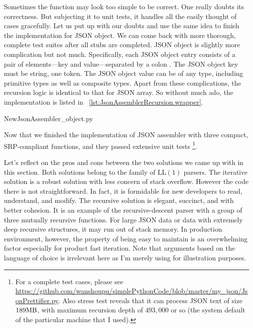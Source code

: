 Sometimes the function may look too simple to be correct.
One really doubts its correctness.
But subjecting it to unit tests, it handles all the easily thought of cases gracefully.
Let us put up with our doubts and use the same idea
to finish the implementation for JSON object.
We can come back with more thorough, complete test suites after all stubs are completed.
JSON object is slightly more complication but not much.
Specifically, each JSON object entry consists of a pair of elements---key and value---separated
by a colon .
The JSON object key must be string, one token.
The JSON object value can be of any type, including primitive types as well as composite types.
Apart from these complications, the recursion logic is identical to that for JSON array.
So without much ado, the implementation is listed in ~\autoref{lst:JsonAssemblerRecursion.wrapper}.

\begin{table}[H]

{NewJsonAssembler_object.py}
\end{table}

Now that we finished the implementation of JSON assembler with three compact,
SRP-compliant functions, and they passed extensive unit tests \footnote{For a complete test
cases, please see
\url{https://github.com/wanshoupu/simplePythonCode/blob/master/my_json/JsonPrettifier.py}.
Also stress test reveals that it can process JSON text of size $189\mbox{\code{MB}}$, with maximum
recursion depth of $493,000$ or so (the system default of the particular machine that I used).}.

Let's reflect on the pros and cons between the two solutions we came up with in this section.
Both solutions belong to the family of LL$(1)$ parsers\cite{Rosenkrantz:1969:LL-parser}.
The iterative solution is a robust solution with less concern of stack overflow.
However the code there is not straightforward.
In fact, it is formidable for new developers to read, understand, and modify.
The recursive solution is elegant, succinct, and with better cohesion.
It is an example of the recursive-descent parser with a group
of three mutually recursive functions.
For large JSON data or data with extremely deep recursive structures, it may run out of stack
memory.
In production environment, however, the property of being easy to maintain is an overwhelming
factor especially for product fast iteration.
Note that arguments based on the language of choice is irrelevant here as I'm merely using
\python for illustration purposes.

